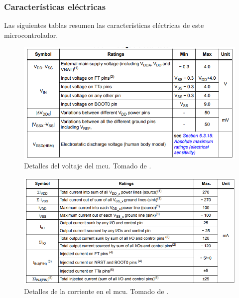 \subsubsection*{Características eléctricas}
Las siguientes tablas resumen las características eléctricas de este microcontrolador.
\begin{figure}[H]
\centering
\includegraphics[width=.55\linewidth]{Imagenes/3.png}
 \caption{Detalles del voltaje del mcu. Tomado de \cite{web}.}
 \label{fig3}
\end{figure}

\begin{figure}[H]
\centering
\includegraphics[width=.55\linewidth]{Imagenes/4.png}
 \caption{Detalles de la corriente en el mcu. Tomado de \cite{web}.}
 \label{fig4}
\end{figure}


